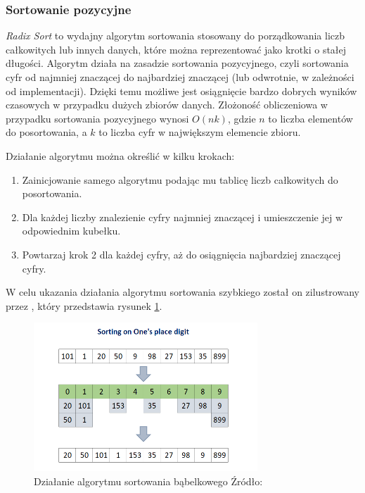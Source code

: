 \subsubsection{Sortowanie pozycyjne}
\textit{Radix Sort} to wydajny algorytm sortowania stosowany do porządkowania liczb całkowitych lub innych danych, które można reprezentować jako krotki o stałej długości. Algorytm działa na zasadzie sortowania pozycyjnego, czyli sortowania cyfr od najmniej znaczącej do najbardziej znaczącej (lub odwrotnie, w zależności od implementacji). Dzięki temu możliwe jest osiągnięcie bardzo dobrych wyników czasowych w przypadku dużych zbiorów danych. Złożoność obliczeniowa w przypadku sortowania pozycyjnego wynosi $O(nk)$, gdzie $n$ to liczba elementów do posortowania, a $k$ to liczba cyfr w największym elemencie zbioru.

Działanie algorytmu można określić w kilku krokach:
\begin{enumerate}
  \item Zainicjowanie samego algorytmu podając mu tablicę liczb całkowitych do posortowania.
  \item Dla każdej liczby znalezienie cyfry najmniej znaczącej i umieszczenie jej w odpowiednim kubełku.
  \item Powtarzaj krok 2 dla każdej cyfry, aż do osiągnięcia najbardziej znaczącej cyfry.
\end{enumerate}

W celu ukazania działania algorytmu sortowania szybkiego został on zilustrowany przez \cite{radix_sort}, który przedstawia rysunek \ref{fig:radix_sort}.

\begin{figure}[H]
  \centering
  \includegraphics[width=0.75\textwidth]{Figures/radix_sort.png}
  \caption{Działanie algorytmu sortowania bąbelkowego Źródło: \cite{radix_sort}}
  \label{fig:radix_sort}
\end{figure}

